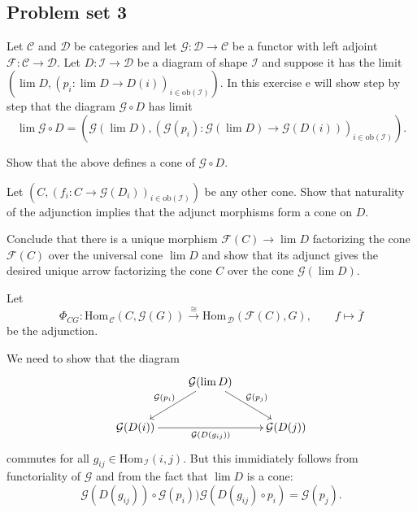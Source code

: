\documentclass[11pt]{book}
\numberwithin{dummy}{section}
\theoremstyle{nonumberbreak}
\newenvironment{sol}[1][]{\ifthenelse{\equal{#1}{}}{\solution}{\solution[#1]}\rm}{\endsolution}
\newenvironment{prob}[1][]{\ifthenelse{\equal{#1}{}}{\problem}{\problem[#1]}\rm}{\endproblem}
\newcommand{\Hom}{\mathrm{Hom}\hspace{1pt}}
\newcommand{\C}{\mathcal{C}}
\newcommand{\D}{\mathcal{D}}
\newcommand{\F}{\mathcal{F}}
\newcommand{\G}{\mathcal{G}}
\newcommand{\I}{\mathcal{I}}
\newcommand{\la}{\longrightarrow}
\begin{document}
\begin{spacing}{1.4}
\newpage




\titlespacing*{\section}{-16.5pt}{0pt}{20pt}
\renewcommand*\thesection{}
\section{Problem set 3} %
\renewcommand*\thesection{\arabic{section}}



\begin{prob}     %
Let $\C$ and $\D$ be categories and let $\G: \D \la \C$ be a functor with left adjoint $\F: \C \la \D$. Let $D: \mathcal{I} \la \D$ be a diagram of shape $\mathcal{I}$ and suppose it has the limit $\left(\lim D, (p_i: \lim D \la D(i))_{i \in \mathrm{ob}(\mathcal{I})}\right)$. In this exercise e will show step by step that the diagram $\G \circ D$ has limit 
$$ \lim \G \circ D = \left( \G(\lim D), (\G(p_i): \G(\lim D) \la \G(D(i)))_{i \in \mathrm{ob}(\mathcal{I})} \right).$$
\begin{compactenum}
\item Show that the above defines a cone of $\G \circ D$. 
\item Let $\left(C, (f_i: C \la \G(D_i))_{i \in \mathrm{ob}(\I)}\right)$ be any other cone. Show that naturality of the adjunction implies that the adjunct morphisms form a cone on $D$.
\item Conclude that there is a unique morphism $\F(C) \la \lim D$ factorizing the cone $\F(C)$ over the universal cone $\lim D$ and show that its adjunct gives the desired unique arrow factorizing the cone $C$ over the cone $\G(\lim D)$. 

\end{compactenum}

\begin{sol}
Let 
$$\Phi_{CG}: \Hom_{\C}(C,\G(G)) \overset{\cong}{\la} \Hom_{\D}(\F(C),G), \qquad f \mapsto \overline{f}$$
be the adjunction.
\begin{compactenum}
\item We need to show that the diagram
$$
\begin{xy}
\xymatrix{
& \G(\lim D) \ar[rd]^{\G(p_j)} \ar[ld]_{\G(p_i)} & \\ \G(D(i)) \ar[rr]_{\G(D(g_{ij}))} && \G(D(j))
}
\end{xy}
$$
commutes for all $g_{ij} \in \Hom_{\I}(i,j)$. But this immidiately follows from functoriality of $\G$ and from the fact that $\lim D$ is a cone:
$$\G(D(g_{ij})) \circ \G(p_i) ) \G(D(g_{ij}) \circ p_i) = \G(p_j).$$



\end{compactenum}
\end{sol}
\end{prob}
\end{spacing}
\end{document}
